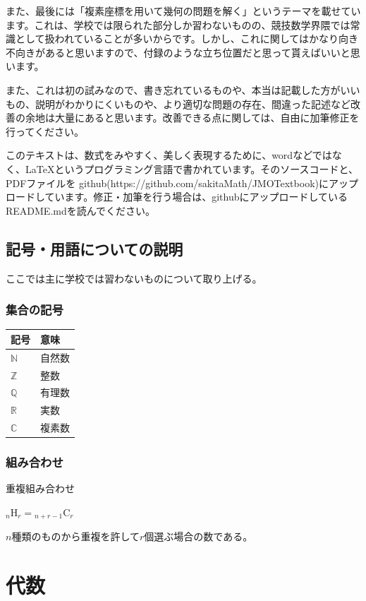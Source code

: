 \documentclass[uplatex,fleqn]{jsbook}
\begin{document}
また、最後には「複素座標を用いて幾何の問題を解く」というテーマを載せています。これは、学校では限られた部分しか習わないものの、競技数学界隈では常識として扱われていることが多いからです。しかし、これに関してはかなり向き不向きがあると思いますので、付録のような立ち位置だと思って貰えばいいと思います。

また、これは初の試みなので、書き忘れているものや、本当は記載した方がいいもの、説明がわかりにくいものや、より適切な問題の存在、間違った記述など改善の余地は大量にあると思います。改善できる点に関しては、自由に加筆修正を行ってください。

このテキストは、数式をみやすく、美しく表現するために、wordなどではなく、\LaTeX というプログラミング言語で書かれています。そのソースコードと、PDFファイルを
github(https://github.com/sakitaMath/JMOTextbook)にアップロードしています。修正・加筆を行う場合は、githubにアップロードしているREADME.mdを読んでください。

\section{記号・用語についての説明}
ここでは主に学校では習わないものについて取り上げる。
\subsection{集合の記号}
\begin{table}[h]
    \begin{tabular}{l|l}
        記号 & 意味\\\hline\hline
        $\mathbb{N}$ & 自然数\\
        $\mathbb{Z}$ & 整数\\
        $\mathbb{Q}$ & 有理数\\
        $\mathbb{R}$ & 実数\\
        $\mathbb{C}$ & 複素数\\\hline
    \end{tabular}
\end{table}

\subsection{組み合わせ}

重複組み合わせ

${}_n \mathrm{ H }_r = {}_{n+r-1} \mathrm{ C }_r$

$n$種類のものから重複を許して$r$個選ぶ場合の数である。

\chapter{代数}
\end{document}
